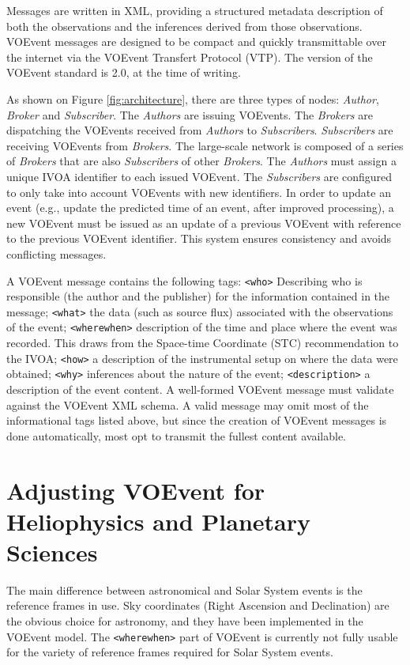 \documentclass[referee,a4paper,12pt,traditabstract]{swsc}
\begin{document}
\begin{linenumbers}
Messages are written in XML, providing a structured metadata description of both the observations and the inferences derived from those observations. VOEvent messages are designed to be compact and quickly transmittable over the internet via the VOEvent Transfert Protocol (VTP). The version of the VOEvent standard is 2.0, at the time of writing.

As shown on Figure \ref{fig:architecture}, there are three types of nodes: \emph{Author}, \emph{Broker} and \emph{Subscriber}.  The \emph{Authors} are issuing VOEvents. The \emph{Brokers} are dispatching the VOEvents received from \emph{Authors} to \emph{Subscribers}. \emph{Subscribers} are receiving VOEvents from \emph{Brokers}. The large-scale network is composed of a series of \emph{Brokers} that are also \emph{Subscribers} of other \emph{Brokers}. The \emph{Authors} must assign a unique IVOA identifier \cite{ivoid} to each issued VOEvent. The \emph{Subscribers} are configured to only take into account VOEvents with new identifiers. In order to update an event (e.g., update the predicted time of an event, after improved processing), a new VOEvent must be issued as an update of a previous VOEvent with reference to the previous VOEvent identifier. This system ensures consistency and avoids conflicting messages. 

A VOEvent message contains the following tags:
{\tt <who>} Describing who is responsible (the author and the publisher) for the information contained in the message;
{\tt <what>} the data (such as source flux) associated with the observations of the event;
{\tt <wherewhen>} description of the time and place where the event was recorded. This draws from the Space-time Coordinate (STC) recommendation to the IVOA;
{\tt <how>} a description of the instrumental setup on where the data were obtained;
{\tt <why>} inferences about the nature of the event;
{\tt <description>} a description of the event content.
A well-formed VOEvent message must validate against the VOEvent XML schema. A valid message may omit most of the informational tags listed above, but since the creation of VOEvent messages is done automatically, most opt to transmit the fullest content available.


\section{Adjusting VOEvent for Heliophysics and Planetary Sciences}
The main difference between astronomical and Solar System events is the reference frames in use. Sky coordinates (Right Ascension and Declination) are the obvious choice for astronomy, and they have been implemented in the VOEvent model. The {\tt <wherewhen>} part of VOEvent is currently not fully usable for the variety of reference frames required for Solar System events. 


\end{linenumbers}
\end{document}
